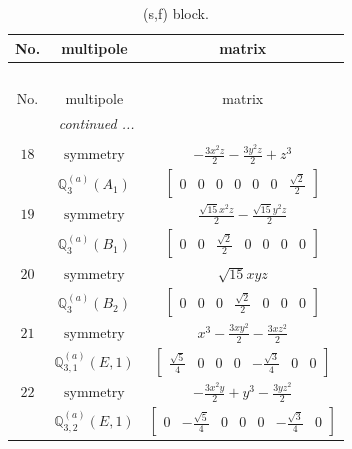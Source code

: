 \documentclass[fleqn,8pt,landscape]{jsarticle}
\begin{document}
\begin{longtable}{ccc}
\caption{(s,f) block.}
 \\
 \hline \hline
No. & multipole & matrix \\ \hline \endfirsthead

\multicolumn{2}{l}{\tablename\ \thetable{}} \\
 \hline \hline
No. & multipole & matrix \\ \hline \endhead

 \hline \hline
\multicolumn{2}{r}{\footnotesize\it continued ...} \\ \endfoot

 \hline \hline
\multicolumn{2}{r}{} \\ \endlastfoot

$ 18 $ & $ \text{symmetry} $ & $ - \frac{3 x^{2} z}{2} - \frac{3 y^{2} z}{2} + z^{3} $ \\
$  $ & $ \mathbb{Q}_{3}^{(a)}(A_{1}) $ & $ \begin{bmatrix} 0 & 0 & 0 & 0 & 0 & 0 & \frac{\sqrt{2}}{2} \end{bmatrix} $ \\ \hline
$ 19 $ & $ \text{symmetry} $ & $ \frac{\sqrt{15} x^{2} z}{2} - \frac{\sqrt{15} y^{2} z}{2} $ \\
$  $ & $ \mathbb{Q}_{3}^{(a)}(B_{1}) $ & $ \begin{bmatrix} 0 & 0 & \frac{\sqrt{2}}{2} & 0 & 0 & 0 & 0 \end{bmatrix} $ \\ \hline
$ 20 $ & $ \text{symmetry} $ & $ \sqrt{15} x y z $ \\
$  $ & $ \mathbb{Q}_{3}^{(a)}(B_{2}) $ & $ \begin{bmatrix} 0 & 0 & 0 & \frac{\sqrt{2}}{2} & 0 & 0 & 0 \end{bmatrix} $ \\ \hline
$ 21 $ & $ \text{symmetry} $ & $ x^{3} - \frac{3 x y^{2}}{2} - \frac{3 x z^{2}}{2} $ \\
$  $ & $ \mathbb{Q}_{3,1}^{(a)}(E,1) $ & $ \begin{bmatrix} \frac{\sqrt{5}}{4} & 0 & 0 & 0 & - \frac{\sqrt{3}}{4} & 0 & 0 \end{bmatrix} $ \\ \hline
$ 22 $ & $ \text{symmetry} $ & $ - \frac{3 x^{2} y}{2} + y^{3} - \frac{3 y z^{2}}{2} $ \\
$  $ & $ \mathbb{Q}_{3,2}^{(a)}(E,1) $ & $ \begin{bmatrix} 0 & - \frac{\sqrt{5}}{4} & 0 & 0 & 0 & - \frac{\sqrt{3}}{4} & 0 \end{bmatrix} $ \\ \hline

\end{longtable}
\end{document}
